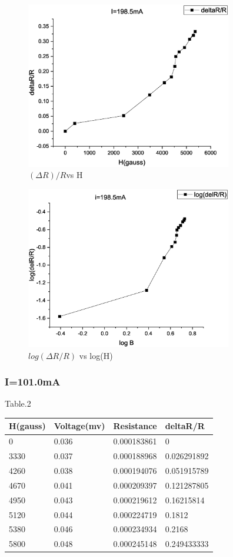\begin{figure}[h!]
\centering
\includegraphics[width=90mm]{images/Graph1.eps}%
\caption{\label{fig:epsart} \((\Delta R)/R \)vs H}
\end{figure}
\begin{figure}[h!]
\centering
\includegraphics[width=90mm]{images/Graph2.eps}%
\caption{\label{fig:epsart} \(log (\Delta R/R)\)  vs log(H)}
\end{figure}


\subsubsection{I=101.0mA}
Table.2
\begin{table}[!ht]
    \centering
    \begin{tabular}{|l|l|l|l|}
    \hline
        H(gauss) & Voltage(mv) & Resistance & deltaR/R \\ \hline
        0 & 0.036 & 0.000183861 & 0 \\ \hline
        3330 & 0.037 & 0.000188968 & 0.026291892 \\ \hline
        4260 & 0.038 & 0.000194076 & 0.051915789 \\ \hline
        4670 & 0.041 & 0.000209397 & 0.121287805 \\ \hline
        4950 & 0.043 & 0.000219612 & 0.16215814 \\ \hline
        5120 & 0.044 & 0.000224719 & 0.1812 \\ \hline
        5380 & 0.046 & 0.000234934 & 0.2168 \\ \hline
        5800 & 0.048 & 0.000245148 & 0.249433333 \\ \hline
    \end{tabular}
\end{table}

